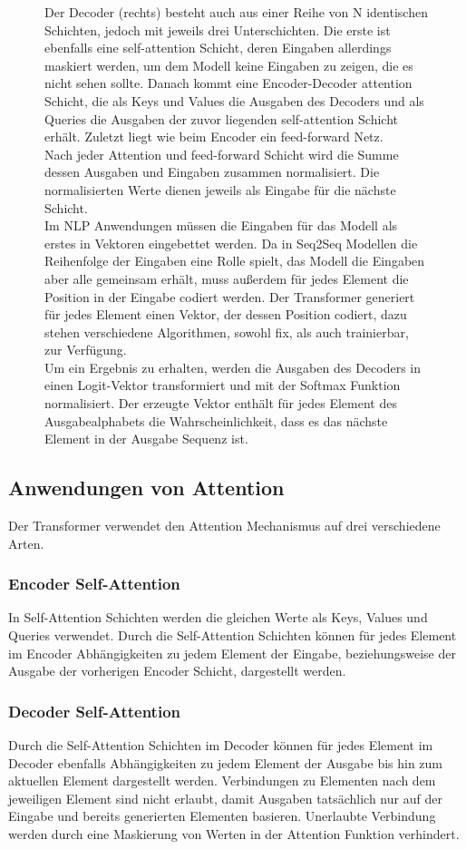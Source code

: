 \documentclass[conference]{IEEEtran}
\begin{document}
\begin{figure}[htbp]
{Der Decoder (rechts) besteht auch aus einer Reihe von N identischen Schichten, jedoch mit jeweils drei Unterschichten. Die erste ist ebenfalls eine self-attention Schicht, deren Eingaben allerdings maskiert werden, um dem Modell keine Eingaben zu zeigen, die es nicht sehen sollte. Danach kommt eine Encoder-Decoder attention Schicht, die als Keys und Values die Ausgaben des Decoders und als Queries die Ausgaben der zuvor liegenden self-attention Schicht erhält. Zuletzt liegt wie beim Encoder ein feed-forward Netz. \\
Nach jeder Attention und feed-forward Schicht wird die Summe dessen Ausgaben und Eingaben zusammen normalisiert. Die normalisierten Werte dienen jeweils als Eingabe für die nächste Schicht. \\
Im NLP Anwendungen müssen die Eingaben für das Modell als erstes in Vektoren eingebettet werden. Da in Seq2Seq Modellen die Reihenfolge der Eingaben eine Rolle spielt, das Modell die Eingaben aber alle gemeinsam erhält, muss außerdem für jedes Element die Position in der Eingabe codiert werden. Der Transformer generiert für jedes Element einen Vektor, der dessen Position codiert, dazu stehen verschiedene Algorithmen, sowohl fix, als auch trainierbar, zur Verfügung. \\
Um ein Ergebnis zu erhalten, werden die Ausgaben des Decoders in einen Logit-Vektor transformiert und mit der Softmax Funktion normalisiert. Der erzeugte Vektor enthält für jedes Element des Ausgabealphabets die Wahrscheinlichkeit, dass es das nächste Element in der Ausgabe Sequenz ist. \cite{attention_is_all_you_need}}
\label{fig:1}
\end{figure}

\subsection{Anwendungen von Attention}
Der Transformer verwendet den Attention Mechanismus auf drei verschiedene Arten.
\subsubsection{Encoder Self-Attention}
In Self-Attention Schichten werden die gleichen Werte als Keys, Values und Queries verwendet. Durch die Self-Attention Schichten können für jedes Element im Encoder Abhängigkeiten zu jedem Element der Eingabe, beziehungsweise der Ausgabe der vorherigen Encoder Schicht, dargestellt werden.
\subsubsection{Decoder Self-Attention}
Durch die Self-Attention Schichten im Decoder können für jedes Element im Decoder ebenfalls Abhängigkeiten zu jedem Element der Ausgabe bis hin zum aktuellen Element dargestellt werden. Verbindungen zu Elementen nach dem jeweiligen Element sind nicht erlaubt, damit Ausgaben tatsächlich nur auf der Eingabe und bereits generierten Elementen basieren. Unerlaubte Verbindung werden durch eine Maskierung von Werten in der Attention Funktion verhindert.
\end{document}

